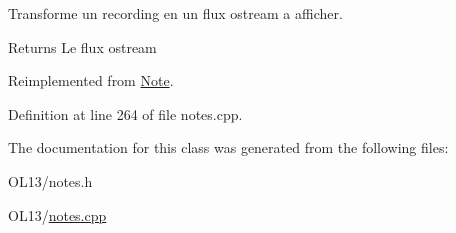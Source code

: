 Transforme un recording en un flux ostream a afficher. 

\begin{DoxyReturn}{Returns}
Le flux ostream 
\end{DoxyReturn}


Reimplemented from \hyperlink{class_note_a1bd4acfbde0b71d05fd7d4ca889bca2b}{Note}.



Definition at line 264 of file notes.\+cpp.



The documentation for this class was generated from the following files\+:\begin{DoxyCompactItemize}
\item 
O\+L13/notes.\+h\item 
O\+L13/\hyperlink{notes_8cpp}{notes.\+cpp}\end{DoxyCompactItemize}
